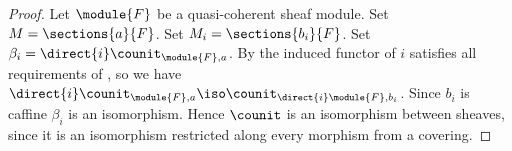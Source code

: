 
\begin{proof}
Let $\module{F}$ be a quasi-coherent sheaf module. 
Set $M = \sections{a}{F}$.
Set $M_i = \sections{b_i}{F}$.
Set $\beta_i = \direct{i}\counit_{\module{F},a}$.
By  the induced functor of $i$ satisfies all requirements of ,
so we have $\direct{i}\counit_{\module{F},a} \iso \counit_{\direct{i}\module{F},b_i}$.
Since $b_i$ is caffine $\beta_i$ is an isomorphism.
Hence $\counit$ is an isomorphism between sheaves, since it is an isomorphism restricted along every morphism from a covering.
\end{proof}